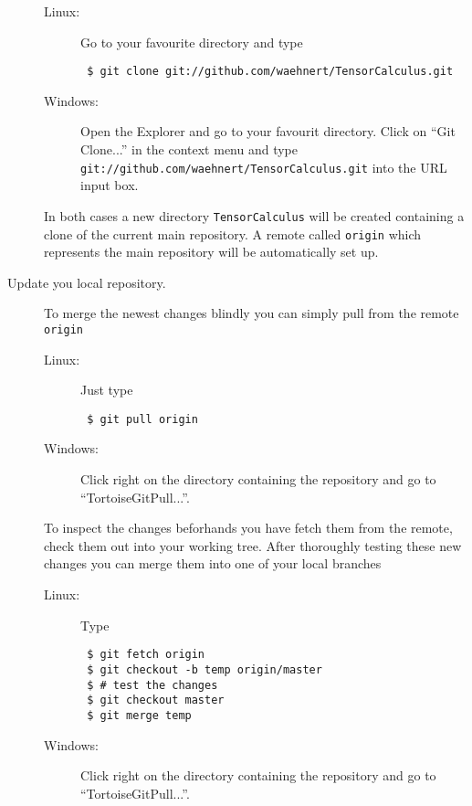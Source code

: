 \documentclass[a4paper,10pt]{scrartcl}
\begin{document}
\begin{description}
    \begin{description}
      \item[Linux:] Go to your favourite directory and type 
        \begin{verbatim} $ git clone git://github.com/waehnert/TensorCalculus.git\end{verbatim}%
      \item[Windows:] Open the Explorer and go to your favourit directory. Click on "`Git Clone..."' in the context menu and type \texttt{git://github.com/waehnert/TensorCalculus.git} into the URL input box.
    \end{description}
    In both cases a new directory \texttt{TensorCalculus} will be created containing a clone of the current main repository. A remote called \texttt{origin} which represents the main repository will be automatically set up.
  \item[Update you local repository.] To merge the newest changes blindly you can simply pull from the remote \texttt{origin}
    \begin{description}
      \item[Linux:] Just type 
        \begin{verbatim} $ git pull origin\end{verbatim}%
      \item[Windows:] Click right on the directory containing the repository and go to "`TortoiseGit\textbar Pull..."'. 
    \end{description}
     To inspect the changes beforhands you have fetch them from the remote, check them out into your working tree. After thoroughly testing these new changes you can merge them into one of your local branches
    \begin{description}
      \item[Linux:] Type
        \begin{verbatim} 
 $ git fetch origin
 $ git checkout -b temp origin/master
 $ # test the changes
 $ git checkout master
 $ git merge temp\end{verbatim}%
      \item[Windows:] Click right on the directory containing the repository and go to "`TortoiseGit\textbar Pull..."'. 
    \end{description}
     
\end{description}
\end{document}
